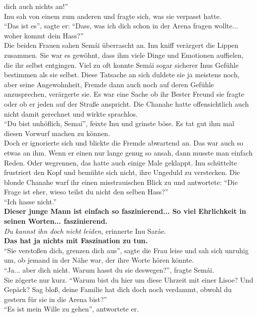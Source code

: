 dich auch nichts an!''\\
Inu sah von einem zum anderen und fragte sich, was sie verpasst hatte.\\
``Das ist es'', sagte er: ``Dass, was ich dich schon in der Arena fragen wollte... woher kommt dein 
Hass?''\\
Die beiden Frauen sahen Semái überrascht an. Inu kniff verärgert die Lippen zusammen. Sie war es 
gewöhnt, dass ihm viele Dinge und Emotionen auffielen, die ihr selbst entgingen. Viel zu oft konnte 
Semái sogar sicherer Inus Gefühle bestimmen als sie selbst. Diese Tatsache an sich duldete sie ja 
meistens noch, aber seine Angewohnheit, Fremde dann auch noch auf deren Gefühle anzusprechen, 
verärgerte sie. Es war eine Sache ob ihr Bester Freund sie fragte oder ob er jeden auf der Straße 
anspricht. Die Chanahe hatte offensichtlich auch nicht damit gerechnet und wirkte sprachlos.\\
``Du bist unhöflich, Semaí'', feixte Inu und grinste böse. Es tat gut ihm mal diesen Vorwurf 
machen zu können.\\
Doch er ignorierte sich und blickte die Fremde abwartend an. Das war auch so etwas an ihm. Wenn er 
einen nur lange genug so ansah, dann musste man einfach Reden. Oder wegrennen, das hatte auch 
einige Male geklappt. Inu schüttelte frustriert den Kopf und bemühte sich nicht, ihre Ungeduld zu 
verstecken. Die blonde Chanahe warf ihr einen misstrauischen Blick zu und antwortete: ``Die Frage 
ist eher, wieso teilst du nicht den selben Hass?''\\
``Ich hasse nicht.''\\
\textbf{Dieser junge Mann ist einfach so faszinierend... So viel Ehrlichkeit in seinen Worten... 
faszinierend.}\\
\textit{Du kannst ihn doch nicht leiden,} erinnerte Inu Saráe.\\
\textbf{Das hat ja nichts mit Faszination zu tun.}\\
``Sie verstoßen dich, grenzen dich aus'', sagte die Frau leise und sah sich unruhig um, ob jemand 
in der Nähe war, der ihre Worte hören könnte.\\
``Ja... aber dich nicht. Warum hasst du sie deswegen?'', fragte Semái.\\
Sie zögerte nur kurz. ``Warum bist du hier um diese Uhrzeit mit einer Lisoe? Und Gepäck? Sag bloß, 
deine Familie hat dich doch noch verdammt, obwohl du gestern für sie in die Arena bist?''\\
``Es ist mein Wille zu gehen'', antwortete er.\\
